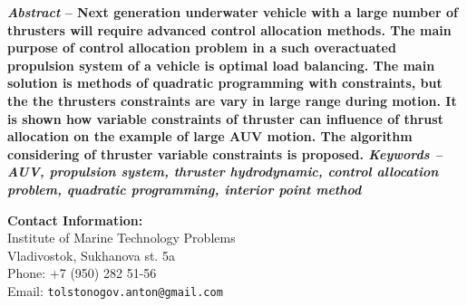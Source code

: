 \documentclass[a0,portrait]{a0poster}
\begin{document}
\vspace{1.5cm}

\begin{minipage}[t]{0.48\linewidth}
\textbf{\textit{Abstract} -- Next generation underwater vehicle with a large number of thrusters will require advanced control allocation methods.
The main purpose of control allocation problem in a such overactuated propulsion system of a vehicle is optimal load balancing. The main solution is
methods of quadratic programming with constraints, but the the thrusters constraints are vary in large range during motion. It is shown how variable constraints of 
thruster can influence of thrust allocation on the example of large AUV motion. The algorithm considering of thruster variable constraints is proposed.
\newline
\textit{Keywords -- AUV, propulsion system, thruster hydrodynamic, control allocation problem, quadratic programming, interior point method}}
\end{minipage}
\hfill
\begin{minipage}[t]{0.48\linewidth}
\begin{flushleft}
\color{DarkSlateGray}\Large \textbf{Contact Information:}\\
Institute of Marine Technology Problems\\ %
Vladivostok, Sukhanova st. 5a\\
Phone: +7 (950) 282 51-56\\ %
Email: \texttt{tolstonogov.anton@gmail.com}\\ %
\end{flushleft}
\end{minipage}

\color{SaddleBrown}
\end{document}
